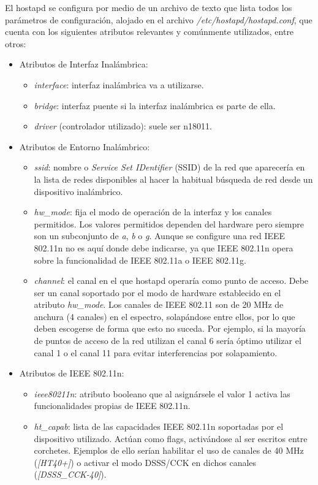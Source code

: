El hostapd se configura por medio de un archivo de texto que lista todos los parámetros de configuración, alojado en el archivo \emph{/etc/hostapd/hostapd.conf}, que cuenta con los siguientes atributos relevantes y comúnmente utilizados, entre otros:
\begin{itemize}
\item Atributos de Interfaz Inalámbrica:
\begin{itemize}
\item \emph{interface}: interfaz inalámbrica va a utilizarse.
\item \emph{bridge}: interfaz puente si la interfaz inalámbrica es parte de ella.
\item \emph{driver} (controlador utilizado): suele ser n18011.
\end{itemize}
\item Atributos de Entorno Inalámbrico:
\begin{itemize}
\item \emph{ssid}: nombre o \emph{Service Set IDentifier} (\acrshort{SSID}) de la red que aparecería en la lista de redes disponibles al hacer la habitual búsqueda de red desde un dispositivo inalámbrico.
\item \emph{hw\_mode}: fija el modo de operación de la interfaz y los canales permitidos. Los valores permitidos dependen del hardware pero siempre son un subconjunto de \emph{a}, \emph{b} o \emph{g}. Aunque se configure una red \acrshort{IEEE} 802.11n no es aquí donde debe indicarse, ya que \acrshort{IEEE} 802.11n opera sobre la funcionalidad de \acrshort{IEEE} 802.11a o \acrshort{IEEE} 802.11g.
\item \emph{channel}: el canal en el que hostapd operaría como punto de acceso. Debe ser un canal soportado por el modo de hardware establecido en el atributo \emph{hw\_mode}. Los canales de \acrshort{IEEE} 802.11 son de 20 MHz de anchura (4 canales) en el espectro, solapándose entre ellos, por lo que deben escogerse de forma que esto no suceda. Por ejemplo, si la mayoría de puntos de acceso de la red utilizan el canal 6 sería óptimo utilizar el canal 1 o el canal 11 para evitar interferencias por solapamiento.
\end{itemize}
\item Atributos de \acrshort{IEEE} 802.11n:
\begin{itemize}
\item \emph{ieee80211n}: atributo booleano que al asignársele el valor 1 activa las funcionalidades propias de \acrshort{IEEE} 802.11n.
\item \emph{ht\_capab}: lista de las capacidades \acrshort{IEEE} 802.11n soportadas por el dispositivo utilizado. Actúan como flags, activándose al ser escritos entre corchetes. Ejemplos de ello serían habilitar el uso de canales de 40 MHz (\emph{[HT40+]}) o activar el modo \acrshort{DSSS}/\acrshort{CCK} en dichos canales (\emph{[DSSS\_CCK-40]}).

\end{itemize}
\end{itemize}
